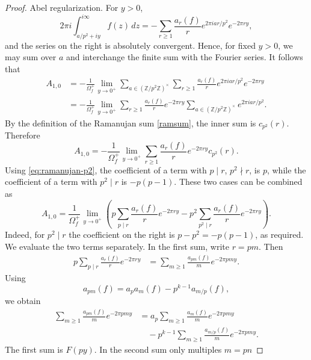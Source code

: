 \documentclass[11pt,table]{amsart}
\newcommand{\Z}{\mathbb{Z}}
\numberwithin{equation}{section}
\begin{document}
\begin{proof}
Abel regularization.  For \(y>0\),
\[
        2\pi i
        \int_{a/p^2+iy}^{i\infty}f(z)\,dz
        =
        -\sum_{r\geq1}
        \frac{a_r(f)}{r}
        e^{2\pi i ar/p^2}e^{-2\pi ry},
\]
and the series on the right is absolutely convergent.  Hence, for
fixed \(y>0\), we may sum over \(a\) and interchange the finite sum
with the Fourier series.  It follows that
\[
\begin{aligned}
        A_{1,0}
        &=
        -\frac1{\Omega_f^+}
        \lim_{y\to0^+}
        \sum_{a\in(\Z/p^2\Z)^\times}
        \sum_{r\geq1}
        \frac{a_r(f)}{r}
        e^{2\pi i ar/p^2}e^{-2\pi ry} \\
        &=
        -\frac1{\Omega_f^+}
        \lim_{y\to0^+}
        \sum_{r\geq1}
        \frac{a_r(f)}{r}e^{-2\pi ry}
        \sum_{a\in(\Z/p^2\Z)^\times}
        e^{2\pi i ar/p^2}.
\end{aligned}
\]
By the definition of the Ramanujan sum \eqref{ramsum}, the inner sum is
\(c_{p^2}(r)\). Therefore
\[
        A_{1,0}
        =
        -\frac1{\Omega_f^+}
        \lim_{y\to0^+}
        \sum_{r\geq1}
        \frac{a_r(f)}r e^{-2\pi ry}c_{p^2}(r).
\]
Using \eqref{eq:ramanujan-p2}, the coefficient of a term with
\(p\mid r\), \(p^2\nmid r\), is \(p\), while the coefficient of a term
with \(p^2\mid r\) is \(-p(p-1)\). These two cases can be combined as
\[
        A_{1,0}
        =
        \frac1{\Omega_f^+}
        \lim_{y\to0^+}
        \left(
        p\sum_{p\mid r}
        \frac{a_r(f)}r e^{-2\pi ry}
        -
        p^2\sum_{p^2\mid r}
        \frac{a_r(f)}r e^{-2\pi ry}
        \right).
\]
Indeed, for \(p^2\mid r\) the coefficient on the right is
\(p-p^2=-p(p-1)\), as required. We evaluate the two terms separately. In the first sum, write \(r=pm\).
Then
\[
\begin{aligned}
        p\sum_{p\mid r}
        \frac{a_r(f)}r e^{-2\pi ry}
        &=
        \sum_{m\geq1}
        \frac{a_{pm}(f)}m e^{-2\pi pmy}.
\end{aligned}
\]
Using
\[
        a_{pm}(f)
        =
        a_pa_m(f)-p^{k-1}a_{m/p}(f),
\]
we obtain
\[
\begin{aligned}
        \sum_{m\geq1}
        \frac{a_{pm}(f)}m e^{-2\pi pmy}
        &=
        a_p
        \sum_{m\geq1}
        \frac{a_m(f)}m e^{-2\pi pmy}        \\
        &\quad
        -
        p^{k-1}
        \sum_{m\geq1}
        \frac{a_{m/p}(f)}m e^{-2\pi pmy}.
\end{aligned}
\]
The first sum is \(F(py)\). In the second sum only multiples \(m=pn\)

\end{proof}
\end{document}
